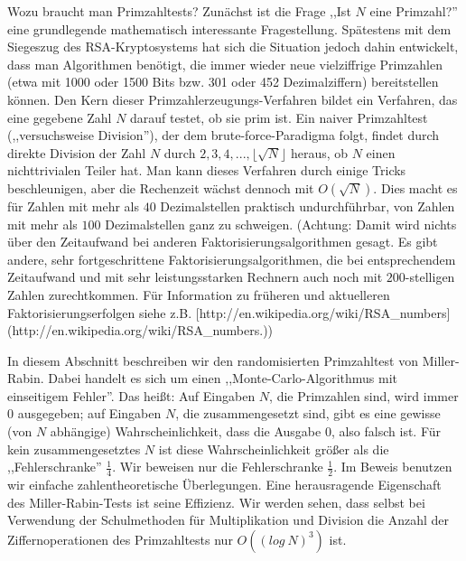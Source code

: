 \documentclass[a4paper]{article}
\begin{document}
\begin{multicols}{3}
{Wozu braucht man Primzahltests? Zunächst ist die Frage ,,Ist $N$ eine Primzahl?'' eine grundlegende mathematisch interessante Fragestellung. Spätestens mit dem Siegeszug des RSA-Kryptosystems hat sich die Situation jedoch dahin entwickelt, dass man Algorithmen benötigt, die immer wieder neue vielziffrige Primzahlen (etwa mit 1000 oder 1500 Bits bzw. 301 oder 452 Dezimalziffern) bereitstellen können. Den Kern dieser Primzahlerzeugungs-Verfahren bildet ein Verfahren, das eine gegebene Zahl $N$ darauf testet, ob sie prim ist. Ein naiver Primzahltest (,,versuchsweise Division''), der dem brute-force-Paradigma folgt, findet durch direkte Division der Zahl $N$ durch $2,3,4,...,\lfloor\sqrt{N}\rfloor$ heraus, ob $N$ einen nichttrivialen Teiler hat. Man kann dieses Verfahren durch einige Tricks beschleunigen, aber die Rechenzeit wächst dennoch mit $O(\sqrt{N})$. Dies macht es für Zahlen mit mehr als $40$ Dezimalstellen praktisch undurchführbar, von Zahlen mit mehr als $100$ Dezimalstellen ganz zu schweigen. (Achtung: Damit wird nichts über den Zeitaufwand bei anderen Faktorisierungsalgorithmen gesagt. Es gibt andere, sehr fortgeschrittene Faktorisierungsalgorithmen, die bei entsprechendem Zeitaufwand und mit sehr leistungsstarken Rechnern auch noch mit $200$-stelligen Zahlen zurechtkommen. Für Information zu früheren und aktuelleren Faktorisierungserfolgen siehe z.B. [http://en.wikipedia.org/wiki/RSA_numbers](http://en.wikipedia.org/wiki/RSA_numbers.))

In diesem Abschnitt beschreiben wir den randomisierten Primzahltest von Miller-Rabin. Dabei handelt es sich um einen ,,Monte-Carlo-Algorithmus mit einseitigem Fehler''. Das heißt: Auf Eingaben $N$, die Primzahlen sind, wird immer $0$ ausgegeben; auf Eingaben $N$, die zusammengesetzt sind, gibt es eine gewisse (von $N$ abhängige) Wahrscheinlichkeit, dass die Ausgabe $0$, also falsch ist. Für kein zusammengesetztes $N$ ist diese Wahrscheinlichkeit größer als die ,,Fehlerschranke'' $\frac{1}{4}$. Wir beweisen nur die Fehlerschranke $\frac{1}{2}$. Im Beweis benutzen wir einfache zahlentheoretische Überlegungen. Eine herausragende Eigenschaft des Miller-Rabin-Tests ist seine Effizienz. Wir werden sehen, dass selbst bei Verwendung der Schulmethoden für Multiplikation und Division die Anzahl der Ziffernoperationen des Primzahltests nur $O((log\ N)^3)$ ist.

}
\end{multicols}
\end{document}
